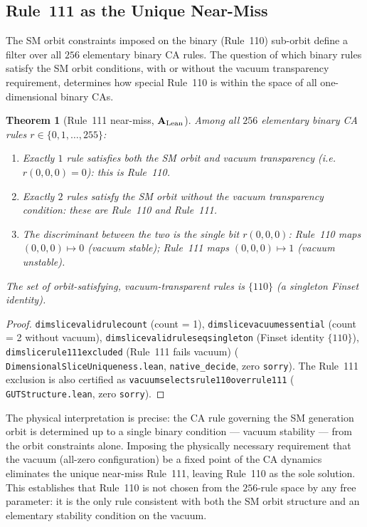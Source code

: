 \documentclass[11pt]{article}
\newtheorem{theorem}{Theorem}[section]
\theoremstyle{remark}
\newcommand{\lean}[1]{%
  \penalty-100
  \begingroup\def\_{\textunderscore\allowbreak}\texttt{#1}\endgroup}
\newcommand{\CatAL}{\ensuremath{\textbf{A}_{\rm Lean}}}
\begin{document}
\subsection{Rule~111 as the Unique Near-Miss}
\label{sec:rule111}

The SM orbit constraints imposed on the binary (Rule~110) sub-orbit define a filter over
all $256$ elementary binary CA rules.
The question of which binary rules satisfy the SM orbit conditions, with or without the
vacuum transparency requirement, determines how special Rule~110 is within the space of
all one-dimensional binary CAs.

\begin{theorem}[Rule~111 near-miss, $\CatAL$]\label{thm:rule111}
Among all $256$ elementary binary CA rules $r \in \{0, 1, \ldots, 255\}$:
\begin{enumerate}[nosep,label=(\roman*)]
\item Exactly $1$ rule satisfies both the SM orbit and vacuum transparency
      (i.e.\ $r(0,0,0) = 0$): this is Rule~110.
\item Exactly $2$ rules satisfy the SM orbit \emph{without} the vacuum transparency condition:
      these are Rule~110 and Rule~111.
\item The discriminant between the two is the single bit $r(0,0,0)$:
      Rule~110 maps $(0,0,0) \mapsto 0$ (vacuum stable); Rule~111 maps $(0,0,0) \mapsto 1$ (vacuum unstable).
\end{enumerate}
The set of orbit-satisfying, vacuum-transparent rules is $\{110\}$ (a singleton Finset identity).
\end{theorem}

\begin{proof}
\lean{dim\_slice\_valid\_rule\_count} (count = 1),
\lean{dim\_slice\_vacuum\_essential} (count = 2 without vacuum),
\lean{dim\_slice\_valid\_rules\_eq\_singleton} (Finset identity $\{110\}$),
\lean{dim\_slice\_rule111\_excluded} (Rule~111 fails vacuum)
(\lean{DimensionalSliceUniqueness.lean}, \texttt{native\_decide},
zero \texttt{sorry}).
The Rule~111 exclusion is also certified as
\lean{vacuum\_selects\_rule110\_over\_rule111}
(\lean{GUTStructure.lean}, zero \texttt{sorry}).
\end{proof}

The physical interpretation is precise: the CA rule governing the SM generation orbit
is determined up to a single binary condition --- vacuum stability --- from the orbit
constraints alone.
Imposing the physically necessary requirement that the vacuum (all-zero configuration)
be a fixed point of the CA dynamics eliminates the unique near-miss Rule~111, leaving
Rule~110 as the sole solution.
This establishes that Rule~110 is not chosen from the $256$-rule space by any free
parameter: it is the only rule consistent with both the SM orbit structure and
an elementary stability condition on the vacuum.
\end{document}
